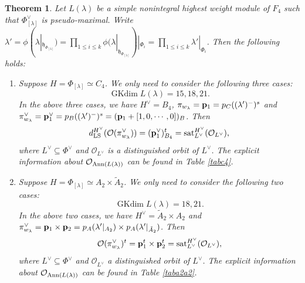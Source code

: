 \documentclass[reqno,12pt]{amsart}
\numberwithin{equation}{section}
\theoremstyle{plain}
\newtheorem{Thm}{Theorem}[section]
\theoremstyle{definition}
\newcommand{\lam}{\lambda}
\newcommand{\Ann}{\mathrm{Ann}}
\renewcommand{\subset}{\subseteq}
\newcommand{\gkd}{\operatorname{GKdim}}
\newcommand{\lest}{\leqslant}
\begin{document}
\begin{Thm}\label{f4-av}
Let $L(\lam)$ be a simple nonintegral highest weight module of $F_4$  such that $\Phi_{[\lam]}^\vee$ is pseudo-maximal. Write $\lam'=\phi(\lam|_{\mathfrak{h}_{\Phi_{[\lambda]}}})=\prod\limits_{1\lest i\lest k} \phi(\lambda|_{\mathfrak{h}_{\Phi_{[\lambda]}}})|_{{\Phi_i}}=\prod\limits_{1\lest i\lest k} \lam'|_{{\Phi_i}}$.
Then the following holds:
    \begin{enumerate}
	\item Suppose $H=\Phi_{[\lam]}\simeq C_4$.
We only need to consider the following three cases:
$$\gkd L(\lam)=15, 18, 21.$$
In the above three cases, we have $H^{\vee}=B_4$,  
$\pi_{w_{\lam}}={\bf p}_{1}=p_{C}((\lam')^-)^s$ and $\pi^{\vee}_{w_{\lam}}={\bf p}^{\vee}_{1}=p_{B}((\lam')^-)^s=({\bf p}_{1}+[1,0,\cdots,0])_B$. Then $$d_{\rm LS}^{H^\vee}(\mathcal{O}(\pi^{\vee}_{w_{\lam}}))=({\bf p}^{\vee}_{1})^t_{B_4} = {\rm sat}_{L^\vee}^{H^\vee} (\mathcal{O}_{L^\vee}),$$
where $L^\vee \subset \Phi^\vee$ and $\mathcal{O}_{L^\vee}$ is a distinguished orbit of $L^\vee$. The explicit information about $\mathcal{O}_{{\rm Ann}(L(\lambda))}$ can be found in Table \ref{tabc4}.








\item Suppose $H=\Phi_{[\lam]}\simeq A_2\times \tilde{A}_2$. We only need to consider the following two cases:
$$\gkd L(\lam)=18, 21.$$
In the above two cases, we have $H^{\vee}=\tilde{A}_2 \times A_2$ and 
$\pi^{\vee}_{w_{\lam}}={\bf p}_{1}\times {\bf p}_{2}=p_{A}(\lam'|_{A_2})\times p_{A}(\lam'|_{\tilde{A}_2})$. Then $$\mathcal{O}(\pi^{\vee}_{w_{\lam}})^t={\bf p}^t_{1}\times {\bf p}^t_{2} = {\rm sat}_{L^\vee}^{H^\vee} (\mathcal{O}_{L^\vee}),$$
where $L^\vee \subset \Phi^\vee$ and $\mathcal{O}_{L^\vee}$ a distinguished orbit of $L^\vee$. The explicit information about $\mathcal{O}_{{\rm Ann}(L(\lambda))}$ can be found in Table \ref{taba2a2}.
  

\end{enumerate}
\end{Thm}
\end{document}
